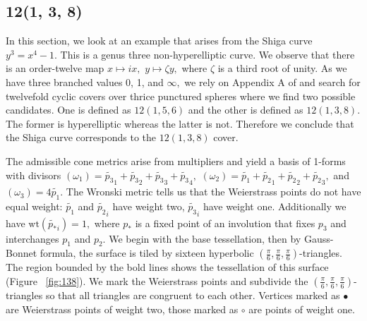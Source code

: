 \documentclass[12pt,reqno]{amsart}
\theoremstyle{definition}
\theoremstyle{remark}
\begin{document}
\subsection{12(1, 3, 8)}

In this section, we look at an example that arises from the Shiga curve $y^3 = x^4 - 1.$ This is a genus three non-hyperelliptic curve. We observe that there is an order-twelve map $x \mapsto i x,$ $y \mapsto \zeta y,$ where $\zeta$ is a third root of unity. As we have three branched values 0, 1, and $\infty,$ we rely on Appendix A of \cite{dthesis} and search for twelvefold cyclic covers over thrice punctured spheres where we find two possible candidates. One is defined as $12(1, 5, 6)$ and the other is defined as $12(1, 3, 8).$ The former is hyperelliptic whereas the latter is not. Therefore we conclude that the Shiga curve corresponds to the $12(1, 3, 8)$ cover. 

The admissible cone metrics arise from multipliers and yield a basis of 1-forms with divisors $(\omega_1) = \widetilde{p_3}_1 + \widetilde{p_3}_2 + \widetilde{p_3}_3 + \widetilde{p_3}_4,$ $(\omega_2) = \widetilde{p_1} + \widetilde{p_2}_1 + \widetilde{p_2}_2 + \widetilde{p_2}_3,$ and $(\omega_3) = 4 \widetilde{p_1}.$ The Wronski metric tells us that the Weierstrass points do not have equal weight: $\widetilde{p_1}$ and $\widetilde{p_2}_i$ have weight two, $\widetilde{p_3}_i$ have weight one. Additionally we have $\textrm{wt}(\widetilde{p_*}_i) = 1,$ where $p_*$ is a fixed point of an involution that fixes $p_3$ and interchanges $p_1$ and $p_2.$ We begin with the base tessellation, then by Gauss-Bonnet formula, the surface is tiled by sixteen hyperbolic $(\frac{\pi}{6}, \frac{\pi}{6}, \frac{\pi}{6})$-triangles. The region bounded by the bold lines shows the tessellation of this surface (Figure~ \cref{fig:138}). We mark the Weierstrass points and subdivide the $(\frac{\pi}{6}, \frac{\pi}{6}, \frac{\pi}{6})$-triangles so that all triangles are congruent to each other. Vertices marked as $\bullet$ are Weierstrass points of weight two, those marked as $\circ$ are points of weight one. 
\end{document}
